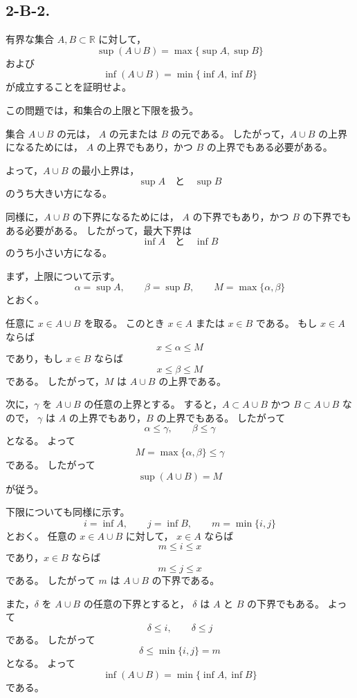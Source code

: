 \subsection{2-B-2.}
\begin{exercise}
	有界な集合 \(A,B\subset\mathbb{R}\) に対して，
	\[
	\sup(A\cup B)
	=
	\max\{\sup A,\sup B\}
	\]
	および
	\[
	\inf(A\cup B)
	=
	\min\{\inf A,\inf B\}
	\]
	が成立することを証明せよ。
\end{exercise}

\begin{background}
	この問題では，和集合の上限と下限を扱う。
	
	集合 \(A\cup B\) の元は，
	\(A\) の元または \(B\) の元である。
	したがって，\(A\cup B\) の上界になるためには，
	\(A\) の上界でもあり，かつ \(B\) の上界でもある必要がある。
	
	よって，\(A\cup B\) の最小上界は，
	\[
	\sup A
	\quad\text{と}\quad
	\sup B
	\]
	のうち大きい方になる。
	
	同様に，\(A\cup B\) の下界になるためには，
	\(A\) の下界でもあり，かつ \(B\) の下界でもある必要がある。
	したがって，最大下界は
	\[
	\inf A
	\quad\text{と}\quad
	\inf B
	\]
	のうち小さい方になる。
\end{background}

\begin{strategy}
	まず，上限について示す。
	\[
	\alpha=\sup A,
	\qquad
	\beta=\sup B,
	\qquad
	M=\max\{\alpha,\beta\}
	\]
	とおく。
	
	任意に \(x\in A\cup B\) を取る。
	このとき \(x\in A\) または \(x\in B\) である。
	もし \(x\in A\) ならば
	\[
	x\leq\alpha\leq M
	\]
	であり，もし \(x\in B\) ならば
	\[
	x\leq\beta\leq M
	\]
	である。
	したがって，\(M\) は \(A\cup B\) の上界である。
	
	次に，\(\gamma\) を \(A\cup B\) の任意の上界とする。
	すると，\(A\subset A\cup B\) かつ \(B\subset A\cup B\) なので，
	\(\gamma\) は \(A\) の上界でもあり，\(B\) の上界でもある。
	したがって
	\[
	\alpha\leq\gamma,
	\qquad
	\beta\leq\gamma
	\]
	となる。
	よって
	\[
	M=\max\{\alpha,\beta\}\leq\gamma
	\]
	である。
	したがって
	\[
	\sup(A\cup B)=M
	\]
	が従う。
	
	下限についても同様に示す。
	\[
	i=\inf A,
	\qquad
	j=\inf B,
	\qquad
	m=\min\{i,j\}
	\]
	とおく。
	任意の \(x\in A\cup B\) に対して，
	\(x\in A\) ならば
	\[
	m\leq i\leq x
	\]
	であり，\(x\in B\) ならば
	\[
	m\leq j\leq x
	\]
	である。
	したがって \(m\) は \(A\cup B\) の下界である。
	
	また，\(\delta\) を \(A\cup B\) の任意の下界とすると，
	\(\delta\) は \(A\) と \(B\) の下界でもある。
	よって
	\[
	\delta\leq i,
	\qquad
	\delta\leq j
	\]
	である。
	したがって
	\[
	\delta\leq\min\{i,j\}=m
	\]
	となる。
	よって
	\[
	\inf(A\cup B)=\min\{\inf A,\inf B\}
	\]
	である。
\end{strategy}